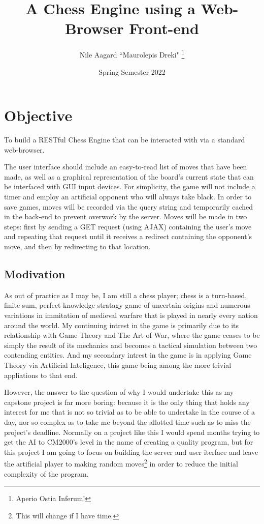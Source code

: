\documentclass[11pt,twoside,letterpaper]{article}
\newcommand{\subtitle}[1]{%
\posttitle{%
\par\end{center}
\begin{center}\large#1\end{center}
\vskip0.5em}%
}
\newcommand{\subject}[1]{%
\pretitle{%
\begin{center}#1\end{center}
\begin{center}\LARGE}%
}
\begin{document}
\title{ A Chess Engine using a Web-Browser Front-end }
\subtitle{ A Capstone Project Proposal }
\subject{ CS1410 \& CS1810 }
\author{ Nile Aagard ``Maurolepis Dreki" \thanks{ Aperio Ostia Inferum! } }
\date{ Spring Semester 2022 }
\maketitle

\section{ Objective }
To build a RESTful Chess Engine that can be interacted with via a standard web-browser.

The user interface should include an easy-to-read list of moves that have been made, as well as a graphical representation of the board's current state that can be interfaced with GUI input devices.
For simplicity, the game will not include a timer and employ an artificial opponent who will always take black. 
In order to save games, moves will be recorded via the query string and temporarily cached in the back-end to prevent overwork by the server.
Moves will be made in two steps: first by sending a GET request (using AJAX) containing the user's move and repeating that request until it receives a redirect containing the opponent's move, and then by redirecting to that location.

\subsection{ Modivation }
As out of practice as I may be, I am still a chess player; chess is a turn-based, finite-sum, perfect-knowledge stratagy game of uncertain origins and numerous variations in immitation of medieval warfare that is played in nearly every nation around the world.
My continuing intrest in the game is primarily due to its relationship with Game Theory and The Art of War, where the game ceases to be simply the result of its mechanics and becomes a tactical simulation between two contending entities.
And my secondary intrest in the game is in applying Game Theory via Artificial Inteligence, this game being among the more trivial appliations to that end.

However, the answer to the question of why I would undertake this as my capstone project is far more boring: because it is the only thing that holds any interest for me that is not so trivial as to be able to undertake in the course of a day, nor so complex as to take me beyond the allotted time such as to miss the project's deadline.
Normally on a project like this I would spend months trying to get the AI to CM2000's level in the name of creating a quality program, but for this project I am going to focus on building the server and user iterface and leave the artificial player to making random moves\footnote{ This will change if I have time. } in order to reduce the initial complexity of the program.
\end{document}
